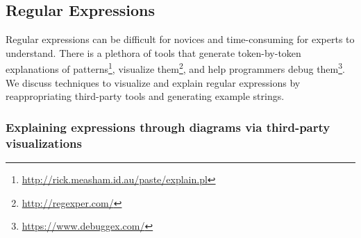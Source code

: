\begin{figure}
\end{figure}

\subsection{Regular Expressions}

\begin{changes}
Regular expressions can be difficult for novices and time-consuming for experts to understand.
There is a plethora of tools that generate token-by-token explanations of patterns\footnote{\url{http://rick.measham.id.au/paste/explain.pl}}, visualize them\footnote{\url{http://regexper.com/}}, and help programmers debug them\footnote{\url{https://www.debuggex.com/}}.
We discuss techniques to visualize and explain regular expressions by reappropriating third-party tools and generating example strings.
\end{changes}

\subsubsection{Explaining expressions through diagrams via third-party visualizations}

